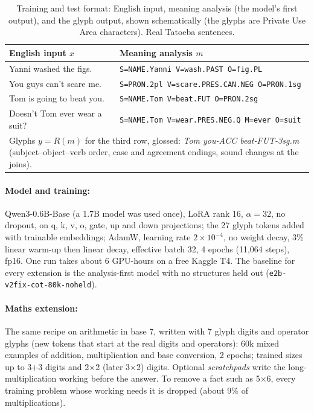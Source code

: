 \documentclass{article} %
\newcommand{\an}[1]{\texttt{#1}}
\newcommand{\run}[1]{\texttt{#1}}
\begin{document}
\begin{table}[t]
\caption{Training and test format: English input, meaning analysis (the model's first output), and the glyph
output, shown schematically (the glyphs are Private Use Area characters). Real Tatoeba sentences.}
\label{fig:pipeline-example}
\centering\small
\begin{tabular}{ll}
\toprule
English input $x$ & Meaning analysis $m$ \\
\midrule
Yanni washed the figs. & \an{S=NAME.Yanni V=wash.PAST O=fig.PL} \\
You guys can't scare me. & \an{S=PRON.2pl V=scare.PRES.CAN.NEG O=PRON.1sg} \\
Tom is going to beat you. & \an{S=NAME.Tom V=beat.FUT O=PRON.2sg} \\
Doesn't Tom ever wear a suit? & \an{S=NAME.Tom V=wear.PRES.NEG.Q M=ever O=suit} \\
\midrule
\multicolumn{2}{p{0.92\linewidth}}{Glyphs $y=R(m)$ for the third row, glossed: \emph{Tom you-ACC beat-FUT-3sg.m} (subject--object--verb order, case and agreement endings, sound changes at the joins).} \\
\bottomrule
\end{tabular}
\end{table}

\paragraph{Model and training:} Qwen3-0.6B-Base \citep{yang2025qwen3} (a 1.7B model was used once), LoRA rank 16,
$\alpha=32$, no dropout, on q, k, v, o, gate, up and down projections; the 27 glyph tokens added with trainable
embeddings; AdamW, learning rate $2\times10^{-4}$, no weight decay, 3\% linear warm-up then linear decay, effective
batch 32, 4 epochs (11,064 steps), fp16. One run takes about 6 GPU-hours on a free Kaggle T4. The baseline for
every extension is the analysis-first model with no structures held out (\run{e2b-v2fix-cot-80k-noheld}).

\paragraph{Maths extension:} The same recipe on arithmetic in base 7, written with 7 glyph digits and operator
glyphs (new tokens that start at the real digits and operators): 60k mixed examples of addition, multiplication and
base conversion, 2 epochs; trained sizes up to 3+3 digits and 2$\times$2 (later 3$\times$2) digits. Optional
\emph{scratchpads} write the long-multiplication working before the answer. To remove a fact such as 5$\times$6,
every training problem whose working needs it is dropped (about 9\% of multiplications).
\end{document}
